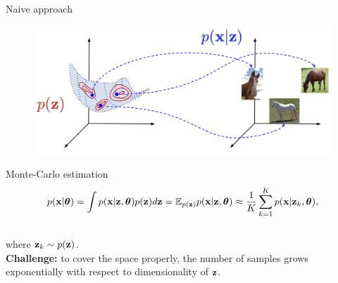 \begin{frame}{Naive approach}
	\begin{figure}
		\includegraphics[width=.75\linewidth]{figs/lvm_diagram}
	\end{figure}
	\begin{block}{Monte-Carlo estimation}
		\vspace{-0.7cm}
		\[
			p(\mathbf{x} | \boldsymbol{\theta}) = \int p(\mathbf{x} | \mathbf{z}, \boldsymbol{\theta}) p(\mathbf{z}) d\mathbf{z} = \mathbb{E}_{p(\mathbf{z})} p(\mathbf{x} | \mathbf{z}, \boldsymbol{\theta}) \approx \frac{1}{K} \sum_{k=1}^{K} p(\mathbf{x} | \mathbf{z}_k, \boldsymbol{\theta}),
		\]
		\vspace{-0.5cm} \\
		where $\mathbf{z}_k \sim p(\mathbf{z})$. \\
		\textbf{Challenge:} to cover the space properly, the number of samples grows exponentially with respect to dimensionality of $\mathbf{z}$. 
	\end{block}
\end{frame}
